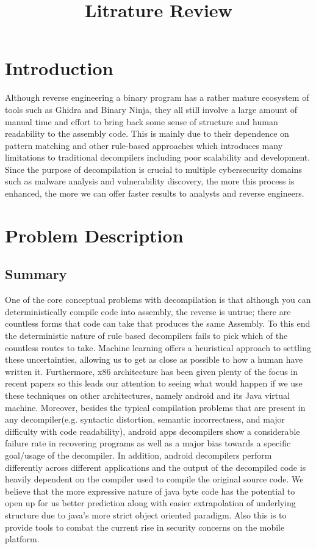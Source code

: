 \documentclass[conference,a4paper]{IEEEtran}
\title{Litrature Review}
\author{
\IEEEauthorblockN{Abdelsalam ElTamawy}
\IEEEauthorblockA{School of Science and Engineering\\the American University in Cairo\\solomspd@aucegypt.edu}
\and
\IEEEauthorblockN{Rinal}
\and
\IEEEauthorblockN{Andrew Fahmy}
\IEEEauthorblockA{School of Science and Engineering\\the American University in Cairo\\andrewk.kamal@aucegypt.edu}
\and
\IEEEauthorblockN{Ahmed}
\and
\IEEEauthorblockN{Ramy}
\and
\IEEEauthorblockN{Dina}
}
\begin{document}
\maketitle


\section{Introduction}
Although reverse engineering a binary program has a rather mature ecosystem of tools such as Ghidra and Binary Ninja, they all still involve a large amount
of manual time and effort to bring back some sense of structure and human readability to the assembly code. This is mainly due to their dependence on pattern matching and other rule-based approaches which introduces many limitations to traditional decompilers including poor scalability and development.
Since the purpose of decompilation is crucial to multiple cybersecurity domains such as malware analysis and vulnerability discovery, the more this process is enhanced, the more we can offer faster results to analysts and reverse engineers.

\section{Problem Description}
\subsection{Summary}
One of the core conceptual problems with decompilation is that although you can deterministically compile code into assembly, the reverse is untrue; there are countless forms that code can take that produces the same Assembly.
To this end the deterministic nature of rule based decompilers fails to pick which of the countless routes to take.
Machine learning offers a heuristical approach to settling these uncertainties, allowing us to get as close as possible to how a human have written it.
Furthermore, x86 architecture has been given plenty of the focus in recent papers so this leads our attention to seeing what would happen if we use these techniques on other architectures, namely android and its Java virtual machine.
Moreover, besides the typical compilation problems that are present in any decompiler(e.g. syntactic distortion, semantic incorrectness, and major difficulty with code readability), android apps decompilers show a considerable failure rate in recovering programs as well as a major bias towards a specific goal/usage of the decompiler.
In addition, android decompilers perform differently across different applications and the output of the decompiled code is heavily dependent on the compiler used to compile the original source code.
We believe that the more expressive nature of java byte code has the potential to open up for us better prediction along with easier extrapolation of underlying structure due to java’s more strict object oriented paradigm.
Also this is to provide tools to combat the current rise in security concerns on the mobile platform.
\end{document}
